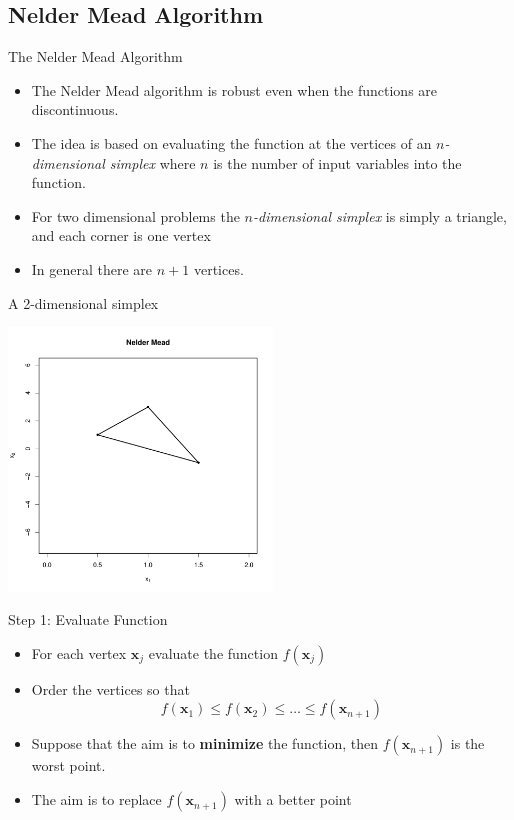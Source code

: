 \documentclass[10pt]{beamer}
\begin{document}
\subsection{Nelder Mead Algorithm}
\begin{frame}{The Nelder Mead Algorithm}
  \begin{itemize}
  \item The Nelder Mead algorithm is robust even when the functions are discontinuous.

  \item The idea is based on evaluating the function at the vertices of an {\em $n$-dimensional simplex} where $n$ is the number of input variables into the function.

  \item For two dimensional problems the {\em $n$-dimensional simplex} is simply a triangle, and each corner is one vertex

  \item In general there are $n+1$ vertices.
  \end{itemize}
\end{frame}
\begin{frame}{A 2-dimensional simplex}
  \begin{center}
    \includegraphics[height=7cm]{RCode/nm0.pdf}
  \end{center}
\end{frame}
\begin{frame}{Step 1: Evaluate Function}
  \begin{itemize}
  \item For each vertex ${\bm x_j}$ evaluate the function $f({\bm x_j})$

  \item Order the vertices so that
    \begin{equation}
      f({\bm x_1})\leq f({\bm x_2})\leq\ldots\leq f({\bm x_{n+1}})
    \end{equation}

  \item Suppose that the aim is to {\bf minimize} the function, then $f({\bm x_{n+1}})$ is the worst point.

  \item The aim is to replace $f({\bm x_{n+1}})$ with a  better point
  \end{itemize}
\end{frame}
\end{document}
